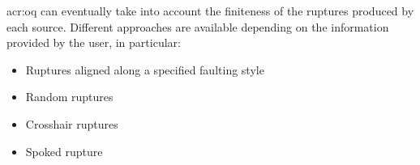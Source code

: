 \gls{acr:oq} can eventually take into account the finiteness of the 
ruptures produced by each source. Different approaches are available 
depending on the information provided by the user, in particular:
\begin{itemize}
\item Ruptures aligned along a specified faulting style
\item Random ruptures 
\item Crosshair ruptures
\item Spoked rupture
\end{itemize}
%


%
